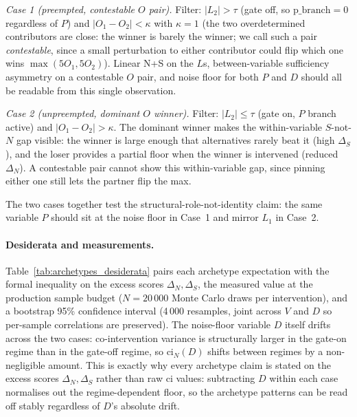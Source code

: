 \textit{Case 1 (preempted, contestable $O$ pair).} Filter:
$\lvert L_2 \rvert > \tau$ (gate off, so $\mathrm{p\_branch} = 0$ regardless of $P$) and
$\lvert O_1 - O_2 \rvert < \kappa$ with $\kappa = 1$ (the two overdetermined contributors
are close: the winner is barely the winner; we call such a pair \emph{contestable},
since a small perturbation to either contributor could flip which one wins
$\max(5O_1, 5O_2)$). Linear N+S on the $L$s, between-variable
sufficiency asymmetry on a contestable $O$ pair, and noise floor for both $P$ and $D$
should all be readable from this single observation.

\textit{Case 2 (unpreempted, dominant $O$ winner).} Filter:
$\lvert L_2 \rvert \le \tau$ (gate on, $P$ branch active) and
$\lvert O_1 - O_2 \rvert > \kappa$. The dominant winner makes the within-variable $S$-not-$N$ gap visible: the winner is large enough that alternatives
rarely beat it (high $\Delta_S$), and the loser provides a partial floor when the winner
is intervened (reduced $\Delta_N$). A contestable pair cannot show this within-variable
gap, since pinning either one still lets the partner flip the max.

The two cases together test the structural-role-not-identity claim: the same variable $P$
should sit at the noise floor in Case~1 and mirror $L_1$ in Case~2.

\paragraph{Desiderata and measurements.}
Table~\ref{tab:archetypes_desiderata} pairs each archetype expectation with the formal
inequality on the excess scores $\Delta_N, \Delta_S$, the measured value at the
production sample budget ($N = 20\,000$ Monte Carlo draws per intervention), and a
bootstrap 95\% confidence interval (4\,000 resamples, joint across $V$ and $D$ so
per-sample correlations are preserved). The noise-floor variable $D$ itself drifts
across the two cases: co-intervention variance is structurally larger in the gate-on
regime than in the gate-off regime, so $\mathrm{ci}_N(D)$ shifts between regimes by a
non-negligible amount. This is exactly why every archetype claim is stated on the
excess scores $\Delta_N, \Delta_S$ rather than raw ci values: subtracting $D$ within
each case normalises out the regime-dependent floor, so the archetype patterns can be
read off stably regardless of $D$'s absolute drift.

